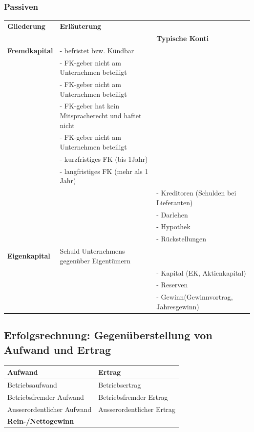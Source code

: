 \documentclass[../ZF_Wing.tex]{subfiles}
\begin{document}
\subsubsection{Passiven}
\begin{table} [H]
\begin{tabular}{l|l|l}
\colorbox{orange!30} {\textbf{Gliederung}} & \colorbox{orange!30} {\textbf{Erläuterung}}\\& & \colorbox{orange!30} {\textbf{Typische Konti}}\\
\hline
\textbf{Fremdkapital} & - befristet bzw. Kündbar \\
& - FK-geber nicht am Unternehmen beteiligt \\
& - FK-geber nicht am Unternehmen beteiligt\\
& - FK-geber hat kein Mitspracherecht und haftet nicht \\
& - FK-geber nicht am Unternehmen beteiligt \\
& - kurzfristiges FK (bis 1Jahr)\\
& - langfristiges FK (mehr als 1 Jahr) \\
&& - Kreditoren (Schulden bei Lieferanten)\\
&& - Darlehen \\
&& - Hypothek \\
&& - Rückstellungen \\
\hline
\textbf{Eigenkapital} & Schuld Unternehmens gegenüber Eigentümern \\
&& - Kapital (EK, Aktienkapital)\\
&& - Reserven\\
&& - Gewinn(Gewinnvortrag, Jahresgewinn)\\
\hline
\end{tabular}

\end{table}

\subsection{Erfolgsrechnung: Gegenüberstellung von Aufwand und Ertrag}
\begin{table}[H]
\begin{tabular}{l|l}
\textbf{Aufwand} & \textbf{Ertrag} \\
\hline
Betriebsaufwand & Betriebsertrag\\
\hline
Betriebsfremder Aufwand & Betriebsfremder Ertrag\\
\hline
Ausserordentlicher Aufwand & Ausserordentlicher Ertrag\\
\hline
\colorbox {blue!10}{\textbf{Rein-/Nettogewinn}} \\
\hline
\end{tabular}
\end{table}
\end{document}
